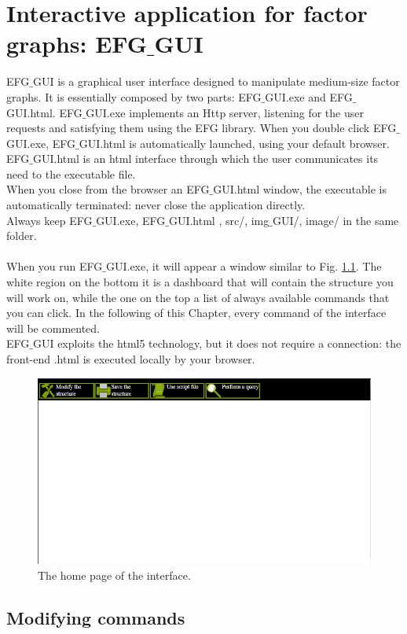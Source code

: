 \newpage
\chapter{Interactive application for factor graphs: EFG$\_$GUI}
\label{chap:GUI}

EFG$\_$GUI is a graphical user interface designed to manipulate medium-size factor graphs. It is essentially composed by two parts: EFG$\_$GUI.exe and EFG$\_$GUI.html.
EFG$\_$GUI.exe implements an Http server, listening for the user requests and satisfying them using the EFG library.
When you double click  EFG$\_$GUI.exe, EFG$\_$GUI.html is automatically launched, using your default browser. EFG$\_$GUI.html is an html interface through which the user communicates its need to the executable file.
\\
When you close from the browser an EFG$\_$GUI.html window, the executable is automatically terminated: never close the application directly.
\\
Always keep EFG$\_$GUI.exe, EFG$\_$GUI.html , src/, img$\_$GUI/, image/ in the same folder.
\\
\\
When you run EFG$\_$GUI.exe, it will appear a window similar to Fig. \ref{fig:home}.
The white region on the bottom it is a dashboard that will contain the structure you will work on, while the one on the top a list of always available commands that you can click. In the following of this Chapter, every command  of the interface will be commented.
\\
EFG$\_$GUI exploits the html5 technology, but it does not require a connection: the front-end .html is executed locally by your browser.

\begin{figure}
	\centering
	\includegraphics[width= 0.49 \columnwidth]{../src/Chapter_additional/04_EFG_GUI/image/img_00.png}
	\caption{The home page of the interface.}
	\label{fig:home}
\end{figure} 

\section{Modifying commands}


